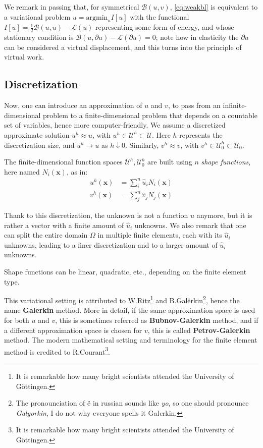 \documentclass{digitaldynamics}
\def\vect#1{\bm{#1}}
\begin{document}
We remark in passing that, for symmetrical $\mathcal{B}(u,v)$, \eqref{eq:weakbl} is equivalent to a variational problem $u = \mathrm{argmin}_{u}I[u]$ with the functional $I[u]=\frac{1}{2}\mathcal{B}(u,u) - \mathcal{L}(u)$ representing some form of energy, and whose stationary condition is $\mathcal{B}(u,\partial u) - \mathcal{L}(\partial u) = 0$; note how in elasticity the $\partial u$ can be considered a virtual displacement, and this turns into the principle of virtual work. 



\subsection{Discretization}

Now, one can introduce an approximation of $u$ and $v$, to pass from an infinite-dimensional problem to a finite-dimensional problem that depends on a countable set of variables, hence more computer-friendly. 
We assume a discretized approximate solution $u^h \approx u$, with $u^h \in \mathcal{U}^h \subset \mathcal{U}$. 
Here $h$ represents the discretization size, and $u^h \rightarrow u$ as $h\downarrow 0$.
Similarly, $v^h \approx v$, with $v^h \in \mathcal{U}_0^h \subset \mathcal{U}_0$. 

The finite-dimensional function spaces $\mathcal{U}^h, \mathcal{U}_0^h$ are built using $n$ \textit{shape functions}, here named $N_i(\vect{x})$, as in:
\begin{align}
u^h(\vect{x}) &= \sum_i^n \hat{u}_i N_i(\vect{x}) \\
v^h(\vect{x}) &= \sum_j^n \hat{v}_j N_j(\vect{x})
\end{align}

Thank to this discretization, the unknown is not a function $u$ anymore, but it is rather a vector with a finite amount of $\hat{u}_i$ unknowns. 
We also remark that one can split the entire domain $\Omega$ in multiple finite elements, each with its $\hat{u}_i$ unknowns, leading to a finer 
discretization and to a larger amount of $\hat{u}_i$ unknowns. 

Shape functions can be linear, quadratic, etc., depending on the finite element type.

This variational setting is attributed to W.Ritz\footnote{It is remarkable how many bright scientists attended the University of Göttingen.}
and B.Gal{\"e}rkin\footnote{The pronounciation of {\"e} in russian sounds like \textit{yo}, so one should pronounce \textit{Galyorkin}, I do not why everyone spells it Gal\textit{e}rkin.}, hence the name \textbf{Galerkin} method. More in detail, if the same approximation space is used for both $u$ and $v$, this is sometimes referred as \textbf{Bubnov-Galerkin} method, and if a different approximation space is chosen for $v$, this is called \textbf{Petrov-Galerkin} method. 
The modern mathematical setting and terminology for the finite element method is credited to R.Courant\footnote{It is remarkable how many bright scientists attended the University of Göttingen.}.
\end{document}

